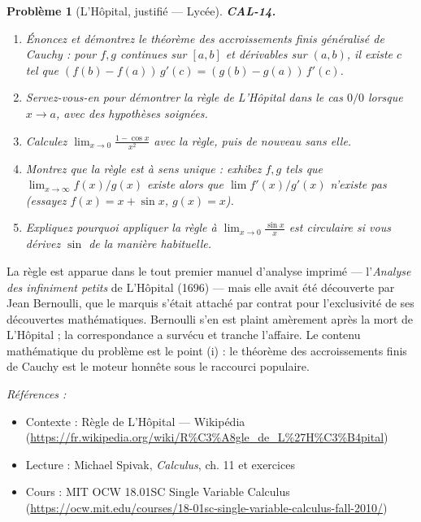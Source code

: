 \documentclass[11pt]{article}
\newtheorem{problem}{Problème}
\newenvironment{refs}{\par\small\noindent\emph{Références :}\begin{itemize}\setlength\itemsep{0pt}}{\end{itemize}\normalsize}
\begin{document}
\begin{problem}[{L'Hôpital, justifié --- Lycée}]
\textbf{CAL-14.} \begin{enumerate}
\item[(i)] Énoncez et démontrez le théorème des accroissements
finis généralisé de Cauchy : pour $ f, g $ continues sur $ [a,b] $ et dérivables sur $ (a,b) $,
il existe $ c $ tel que $ (f(b)-f(a))\,g'(c) = (g(b)-g(a))\,f'(c) $.
\item[(ii)] Servez-vous-en pour démontrer
la règle de L'Hôpital dans le cas $ 0/0 $ lorsque $ x\to a $, avec des
hypothèses soignées.
\item[(iii)] Calculez $ \lim_{x\to 0} \frac{1-\cos x}{x^2} $ avec la règle, puis
de nouveau sans elle.
\item[(iv)] Montrez que la règle est à sens unique : exhibez $ f, g $ tels que
$ \lim_{x\to\infty} f(x)/g(x) $ existe alors que $ \lim f'(x)/g'(x) $ n'existe pas (essayez
$ f(x) = x + \sin x $, $ g(x) = x $).
\item[(v)] Expliquez pourquoi appliquer la règle à
$ \lim_{x\to 0} \frac{\sin x}{x} $ est circulaire si vous dérivez $ \sin $ de la
manière habituelle.
\end{enumerate}

\end{problem}

\noindent La règle est apparue dans le tout premier manuel d'analyse imprimé ---
l'\textit{Analyse des infiniment petits} de L'Hôpital (1696) --- mais elle avait été découverte par
Jean Bernoulli, que le marquis s'était attaché par contrat pour l'exclusivité de ses
découvertes mathématiques. Bernoulli s'en est plaint amèrement après la mort de L'Hôpital ;
la correspondance a survécu et tranche l'affaire. Le contenu mathématique du
problème est le point (i) : le théorème des accroissements finis de Cauchy est le moteur honnête sous le raccourci populaire.

\begin{refs}
\item Contexte : Règle de L'Hôpital --- Wikipédia (\url{https://fr.wikipedia.org/wiki/R%C3%A8gle_de_L%27H%C3%B4pital})
\item Lecture : Michael Spivak, \textit{Calculus}, ch. 11 et exercices
\item Cours : MIT OCW 18.01SC Single Variable Calculus (\url{https://ocw.mit.edu/courses/18-01sc-single-variable-calculus-fall-2010/})
\end{refs}

\bigskip
\end{document}
